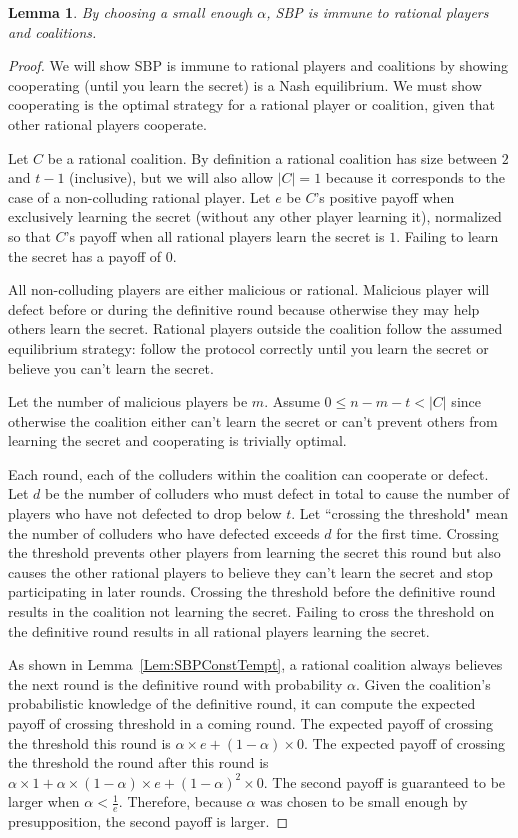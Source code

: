 \documentclass{dalcsthesis}
\newtheorem{lemma}{Lemma}
\begin{document}
\begin{lemma}\label{Lem:SBPRatNash}By choosing a small enough $\alpha$, SBP is immune to rational players and coalitions.\end{lemma}
\begin{proof}
We will show SBP is immune to rational players and coalitions by showing cooperating (until you learn the secret) is a Nash equilibrium. We must show cooperating is the optimal strategy for a rational player or coalition, given that other rational players cooperate.

Let $C$ be a rational coalition. By definition a rational coalition has size between $2$ and $t-1$ (inclusive), but we will also allow $|C| = 1$ because it corresponds to the case of a non-colluding rational player. Let $e$ be $C$'s positive payoff when exclusively learning the secret (without any other player learning it), normalized so that $C$'s payoff when all rational players learn the secret is $1$. Failing to learn the secret has a payoff of 0.

All non-colluding players are either malicious or rational. Malicious player will defect before or during the definitive round because otherwise they may help others learn the secret. Rational players outside the coalition follow the assumed equilibrium strategy: follow the protocol correctly until you learn the secret or believe you can't learn the secret.

Let the number of malicious players be $m$. Assume $0 \leq n - m - t < |C|$ since otherwise the coalition either can't learn the secret or can't prevent others from learning the secret and cooperating is trivially optimal.

Each round, each of the colluders within the coalition can cooperate or defect. Let $d$ be the number of colluders who must defect in total to cause the number of players who have not defected to drop below $t$. Let ``crossing the threshold" mean the number of colluders who have defected exceeds $d$ for the first time. Crossing the threshold prevents other players from learning the secret this round but also causes the other rational players to believe they can't learn the secret and stop participating in later rounds. Crossing the threshold before the definitive round results in the coalition not learning the secret. Failing to cross the threshold on the definitive round results in all rational players learning the secret.

As shown in Lemma~\ref{Lem:SBPConstTempt}, a rational coalition always believes the next round is the definitive round with probability $\alpha$. Given the coalition's probabilistic knowledge of the definitive round, it can compute the expected payoff of crossing threshold in a coming round. The expected payoff of crossing the threshold this round is $\alpha \times e + (1-\alpha) \times 0$. The expected payoff of crossing the threshold the round after this round is $\alpha \times 1 + \alpha \times (1-\alpha) \times e + (1-\alpha)^2 \times 0$. The second payoff is guaranteed to be larger when $\alpha < \frac{1}{e}$. Therefore, because $\alpha$ was chosen to be small enough by presupposition, the second payoff is larger.


\end{proof}
\end{document}
